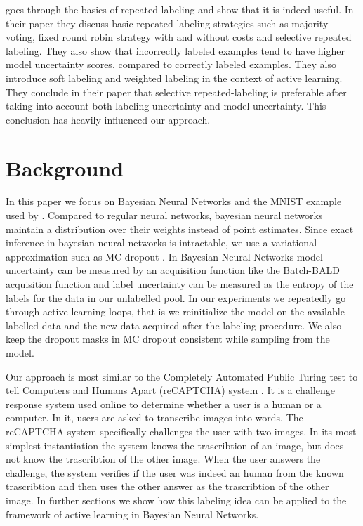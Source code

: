 \documentclass[twoside,11pt]{article}
\begin{document}
\cite{ipeirotis2014repeated} goes through the basics of repeated labeling and show that it is indeed useful. In their paper they discuss basic repeated labeling strategies such as majority voting, fixed round robin strategy with and without costs and selective repeated labeling. They also show that incorrectly labeled examples tend to have higher model uncertainty scores, compared to correctly labeled examples. They also introduce soft labeling and weighted labeling in the context of active learning. They conclude in their paper that selective repeated-labeling is preferable after taking into account both labeling uncertainty and model uncertainty. This conclusion has heavily influenced our approach.


\section{Background}

In this paper we focus on Bayesian Neural Networks and the MNIST example used by \cite{kirsch2019batchbald}. Compared to regular neural networks, bayesian neural networks maintain a distribution over their weights instead of point estimates. Since exact inference in bayesian neural networks is intractable, we use a variational approximation such as MC dropout \citep{gal2016dropout}. In Bayesian Neural Networks model uncertainty can be measured by an acquisition function like the Batch-BALD acquisition function and label uncertainty can be measured as the entropy of the labels for the data in our unlabelled pool. In our experiments we repeatedly go through active learning loops, that is we reinitialize the model on the available labelled data and the new data acquired after the labeling procedure. We also keep the dropout masks in MC dropout consistent while sampling from the model.

Our approach is most similar to the Completely Automated Public Turing test to tell Computers and Humans Apart (reCAPTCHA) system \cite{recaptcha}. It is a challenge response system used online to determine whether a user is a human or a computer. In it, users are asked to transcribe images into words. The reCAPTCHA system specifically challenges the user with two images. In its most simplest instantiation the system knows the trascribtion of an image, but does not know the trascribtion of the other image. When the user answers the challenge, the system verifies if the user was indeed an human from the known trascribtion and then uses the other answer as the trascribtion of the other image. In further sections we show how this labeling idea can be applied to the framework of active learning in Bayesian Neural Networks.
\end{document}
